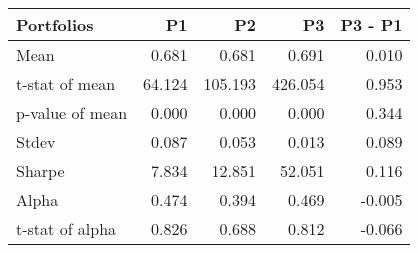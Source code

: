 \begin{tabular}{lrrrr}
\toprule
Portfolios & P1 & P2 & P3 & P3 - P1 \\
\midrule
Mean & 0.681 & 0.681 & 0.691 & 0.010 \\
t-stat of mean & 64.124 & 105.193 & 426.054 & 0.953 \\
p-value of mean & 0.000 & 0.000 & 0.000 & 0.344 \\
Stdev & 0.087 & 0.053 & 0.013 & 0.089 \\
Sharpe & 7.834 & 12.851 & 52.051 & 0.116 \\
Alpha & 0.474 & 0.394 & 0.469 & -0.005 \\
t-stat of alpha & 0.826 & 0.688 & 0.812 & -0.066 \\
\bottomrule
\end{tabular}
